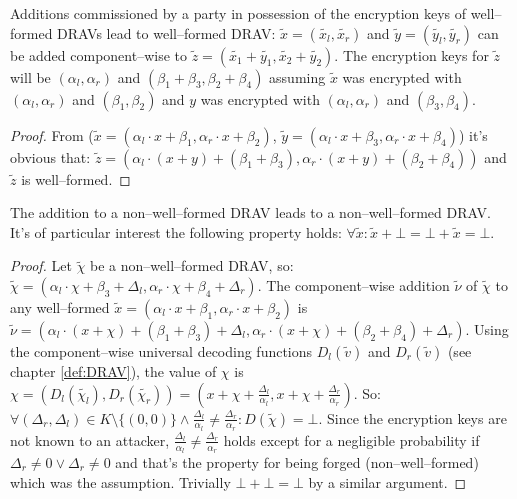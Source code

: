 \begin{lem}
  \label{lem:DRAV-add}

Additions commissioned by a party in possession of the encryption keys of
well--formed DRAVs lead to well--formed DRAV: $\widetilde{x} =
(\widetilde{x_l}, \widetilde{x_r})$ and $\widetilde{y} = (\widetilde{y_l},
\widetilde{y_r})$ can be added component--wise to $\widetilde{z} =
\left(\widetilde{x_1} + \widetilde{y_1}, \widetilde{x_2} +
\widetilde{y_2}\right)$. The encryption keys for $\widetilde{z}$ will be
$(\alpha_l, \alpha_r)$ and $(\beta_1 + \beta_3, \beta_2 + \beta_4)$ assuming
$\widetilde{x}$ was encrypted with $(\alpha_l, \alpha_r)$ and $(\beta_1,
\beta_2)$ and $y$ was encrypted with $(\alpha_l, \alpha_r)$ and $(\beta_3,
\beta_4)$.

\end{lem}
\begin{proof}

From ($\widetilde{x} = \left(\alpha_l \cdot x + \beta_1,
\alpha_r \cdot x + \beta_2\right)$, $\widetilde{y} = \left(\alpha_l \cdot x +
\beta_3, \alpha_r \cdot x + \beta_4\right)$) it's obvious that: $\widetilde{z} =
\left(\alpha_l \cdot (x+y) + (\beta_1 + \beta_3), \alpha_r \cdot (x+y) +
(\beta_2 + \beta_4)\right)$ and $\widetilde{z}$ is well--formed.

\end{proof}

\begin{lem}
  \label{lem:DRAV-add-bad}

The addition to a non--well--formed DRAV leads to a non--well--formed DRAV. It's
of particular interest the following property holds: $\forall \widetilde{x}:
\widetilde{x} + \bot = \bot + \widetilde{x} = \bot$.

\end{lem}
\begin{proof}

Let $\widetilde{\chi}$ be a non--well--formed DRAV, so: $\widetilde{\chi} =
(\alpha_l \cdot \chi + \beta_3 + \Delta_l, \alpha_r \cdot \chi + \beta_4 +
\Delta_r)$. The component--wise addition $\widetilde{\nu}$ of $\widetilde{\chi}$
to any well--formed $\widetilde{x} = (\alpha_l \cdot x + \beta_1, \alpha_r \cdot
x + \beta_2)$ is $\widetilde{\nu} = (\alpha_l \cdot (x+\chi) + (\beta_1+\beta_3)
+ \Delta_l, \alpha_r \cdot (x+\chi) + (\beta_2+\beta_4) + \Delta_r)$.  Using the
component--wise universal decoding functions $D_l(\widetilde{v})$ and
$D_r(\widetilde{v})$ (see chapter \ref{def:DRAV}), the value of $\chi$ is $\chi
= (D_l(\widetilde{\chi_l}), D_r(\widetilde{\chi_r})) = (x + \chi +
\frac{\Delta_l}{\alpha_l}, x + \chi + \frac{\Delta_r}{\alpha_r})$. So: $\forall
(\Delta_r, \Delta_l) \in K \setminus \{(0, 0)\} \wedge \frac{\Delta_l}{\alpha_l}
\neq \frac{\Delta_r}{\alpha_r}: D(\widetilde{\chi}) = \bot$. Since the
encryption keys are not known to an attacker, $\frac{\Delta_l}{\alpha_l} \neq
\frac{\Delta_r}{\alpha_r}$ holds except for a negligible probability if
$\Delta_r \neq 0 \vee \Delta_r \neq 0$ and that's the property for being forged
(non--well--formed) which was the assumption. Trivially $\bot + \bot = \bot$ by
a similar argument.

\end{proof}


